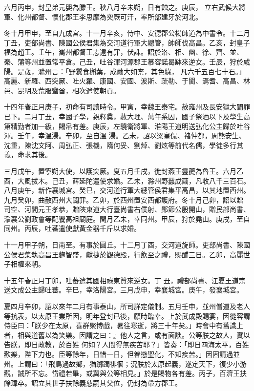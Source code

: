 \begin{pinyinscope}
 六月丙申，封皇弟元嬰為滕王。秋八月辛未朔，日有蝕之。庚辰，
 立右武候大將軍、化州都督、懷化郡王李思摩為突厥可汗，率所部建牙於河北。



 冬十月甲申，至自九成宮。十一月辛亥，侍中、安德郡公楊師道為中書令。十二月丁丑，吏部尚書、陳國公侯君集為交河道行軍大總管，帥師伐高昌。乙亥，封皇子福為趙王。壬午，巂州都督王志遠有罪，伏誅。詔於洛、相、幽、徐、齊、並、秦、蒲等州並置常平倉。己丑，吐谷渾河源郡王慕容諾曷缽來逆女。壬辰，狩於咸陽。是歲，滁州言：「野蠶食槲葉，成繭大如柰，其色綠，
 凡六千五百七十石。」高麗、新羅、西突厥、吐火羅、康國、安國、波斯、疏勒、于闐、焉耆、高昌、林邑、昆明及荒服蠻酋，相次遣使朝貢。



 十四年春正月庚子，初命有司讀時令。甲寅，幸魏王泰宅。赦雍州及長安獄大闢罪已下。二月丁丑，幸國子學，親釋奠，赦大理、萬年系囚，國子祭酒以下及學生高第精勤者加一級，賜帛有差。庚辰，左驍衛將軍、淮陽王道明送弘化公主歸於吐谷渾。壬午，幸溫湯。辛卯，至自溫
 湯。乙未，詔以梁皇侃、褚仲都，周熊安生、沈重，陳沈文阿、周弘正、張機，隋何妥、劉焯、劉炫等前代名儒，學徒多行其義，命求其後。



 三月戊午，置寧朔大使，以護突厥。夏五月壬戌，徙封燕王靈夔為魯王。六月乙酉，大風拔木。己丑，薛延陀遣使求婚。乙未，滁州野蠶成繭，凡收八千三百石。八月庚午，新作襄城宮。癸巳，交河道行軍大總管侯君集平高昌，以其地置西州。九月癸卯，曲赦西州大闢罪。乙卯，於西州置安西都護府。冬十月己卯，詔以贈
 司空、河間元王孝恭，贈陜東道大行臺尚書右僕射、鄖節公殷開山，贈民部尚書、渝襄公劉政會等配饗高祖廟庭。閏月乙未，幸同州。甲辰，狩於堯山。庚戌，至自同州。丙辰，吐蕃遣使獻黃金器千斤以求婚。



 十一月甲子朔，日南至。有事於圓丘。十二月丁酉，交河道旋師。吏部尚書、陳國公侯君集執高昌王麴智盛，獻捷於觀德殿，行飲至之禮，賜酺三日。乙卯，高麗世子相權來朝。



 十五年春正月丁卯，吐蕃遣其國相祿東贊來逆女。丁
 丑，禮部尚書、江夏王道宗送文成公主歸吐蕃。辛巳，幸洛陽宮。三月戊申，幸襄城宮。庚午，發襄城宮。



 夏四月辛卯，詔以來年二月有事泰山，所司詳定儀制。五月壬申，並州僧道及老人等抗表，以太原王業所因，明年登封已後，願時臨幸。上於武成殿賜宴，因從容謂侍臣曰：「朕少在太原，喜群聚博戲，暑往寒逝，將三十年矣。」時會中有舊識上者，相與道舊以為笑樂。因謂之曰：』他人之言，或有面諛。公等朕之故人，實以告朕，即日政教，於百姓
 何如？人間得無疾苦耶？」皆奏：「即日四海太平，百姓歡樂，陛下力也。臣等餘年，日惜一日，但眷戀聖化，不知疾苦。」因固請過並州。上謂曰：「飛鳥過故鄉，猶躑躅徘徊；況朕於太原起義，遂定天下，復少小游觀，誠所不忘。岱禮若畢，或冀與公等相見。」於是賜物各有差。丙子，百濟王扶餘璋卒。詔立其世子扶餘義慈嗣其父位，仍封為帶方郡王。




\end{pinyinscope}
